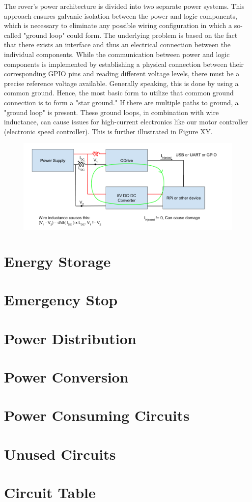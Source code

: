 The rover's power architecture is divided into two separate power systems. This approach ensures galvanic isolation between the power and logic components, which is necessary to eliminate any possible wiring configuration in which a so-called "ground loop" could form. The underlying problem is based on the fact that there exists an interface and thus an electrical connection between the individual components. While the communication between power and logic components is implemented by establishing a physical connection between their corresponding GPIO pins and reading different voltage levels, there must be a precise reference voltage available. Generally speaking, this is done by using a common ground. Hence, the most basic form to utilize that common ground connection is to form a "star ground." If there are multiple paths to ground, a "ground loop" is present. These ground loops, in combination with wire inductance, can cause issues for high-current electronics like our motor controller (electronic speed controller). This is further illustrated in Figure XY.

\begin{figure}[h]
\includegraphics[width=\textwidth]{contents/figures/ground_loop_bad.png}
\end{figure}




\section{Energy Storage}

\section{Emergency Stop}

\section{Power Distribution}

\section{Power Conversion}

\section{Power Consuming Circuits}

\section{Unused Circuits}

\section{Circuit Table}




